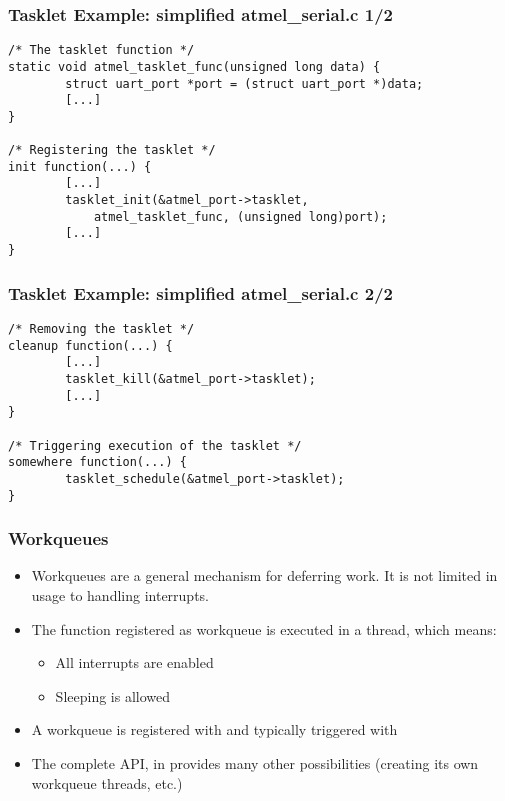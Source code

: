 \begin{frame}[fragile]
  \frametitle{Tasklet Example: simplified atmel\_serial.c 1/2}
\begin{verbatim}
/* The tasklet function */
static void atmel_tasklet_func(unsigned long data) {
        struct uart_port *port = (struct uart_port *)data;
        [...]
}

/* Registering the tasklet */
init function(...) {
        [...]
        tasklet_init(&atmel_port->tasklet,
            atmel_tasklet_func, (unsigned long)port);
        [...]
}
\end{verbatim}
\end{frame}

\begin{frame}[fragile]
  \frametitle{Tasklet Example: simplified atmel\_serial.c 2/2}
\begin{verbatim}
/* Removing the tasklet */
cleanup function(...) {
        [...]
        tasklet_kill(&atmel_port->tasklet);
        [...]
}

/* Triggering execution of the tasklet */
somewhere function(...) {
        tasklet_schedule(&atmel_port->tasklet);
}
\end{verbatim}
\end{frame}

\begin{frame}
  \frametitle{Workqueues}
  \begin{itemize}
  \item Workqueues are a general mechanism for deferring work. It is
    not limited in usage to handling interrupts.
  \item The function registered as workqueue is executed in a thread,
    which means:
    \begin{itemize}
    \item All interrupts are enabled
    \item Sleeping is allowed
    \end{itemize}
  \item A workqueue is registered with  and typically
    triggered with 
  \item The complete API, in  provides
    many other possibilities (creating its own workqueue threads,
    etc.)
  \end{itemize}
\end{frame}

